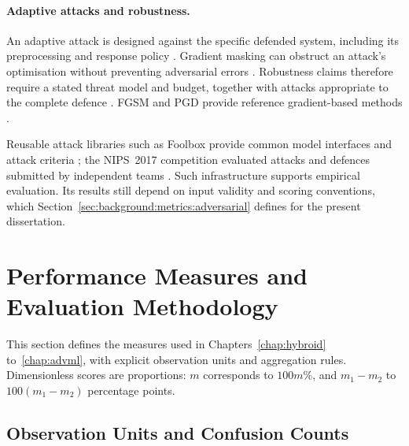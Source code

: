\paragraph{Adaptive attacks and robustness.} An adaptive attack is designed against the
specific defended system, including its preprocessing and response policy
\cite{tramer2020adaptive}. Gradient masking can obstruct an attack's optimisation without
preventing adversarial errors \cite{athalye2018obfuscated}. Robustness claims therefore
require a stated threat model and budget, together with attacks appropriate to the complete
defence \cite{carlini2019evaluating}. FGSM and PGD provide reference gradient-based methods
\cite{goodfellow2015explaining,madry2018pgd}.

Reusable attack libraries such as Foolbox provide common model interfaces and attack criteria
\cite{rauber2017foolbox}; the NIPS~2017 competition evaluated attacks and defences submitted
by independent teams \cite{kurakin2018competition}. Such infrastructure supports empirical
evaluation. Its results still depend on input validity and scoring conventions, which
Section~\ref{sec:background:metrics:adversarial} defines for the present dissertation.

\section{Performance Measures and Evaluation Methodology}
\label{sec:background:evaluation}

This section defines the measures used in Chapters~\ref{chap:hybroid} to~\ref{chap:advml}, with
explicit observation units and aggregation rules. Dimensionless scores are proportions:
$m$ corresponds to $100m$\%, and $m_1-m_2$ to $100(m_1-m_2)$ percentage points.

\subsection{Observation Units and Confusion Counts}
\label{sec:background:metrics:counts}

